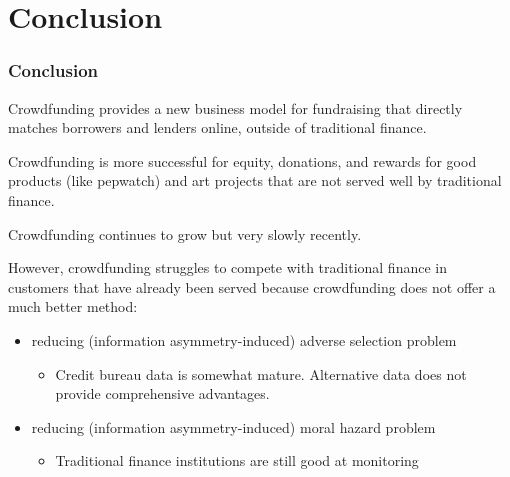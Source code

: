 \documentclass[aspectratio=169,xcolor=dvipsnames]{beamer}
\begin{document}
\section{Conclusion}




\begin{frame}
\frametitle{Conclusion}


Crowdfunding provides a new business model for fundraising that directly matches borrowers and lenders online, outside of traditional finance.

\medskip 

Crowdfunding is more successful for equity, donations, and rewards for good products (like pepwatch) and art projects that are not served well by traditional finance. 

\medskip 

Crowdfunding continues to grow but very slowly recently. 

\medskip 

However, crowdfunding struggles to compete with traditional finance in customers that have already been served because crowdfunding does not offer a much better method: 
\begin{itemize}
    \item reducing (information asymmetry-induced) adverse selection problem
    \begin{itemize}
        \item Credit bureau data is somewhat mature. Alternative data does not provide comprehensive advantages. 
    \end{itemize}
    \item reducing (information asymmetry-induced) moral hazard problem
    \begin{itemize}
        \item Traditional finance institutions are still good at monitoring
    \end{itemize}
\end{itemize}




\end{frame} 
\end{document}
